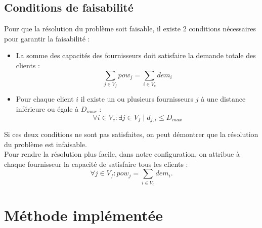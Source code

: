 \documentclass[letterpaper]{article}
\begin{document}
\subsection{Conditions de faisabilité}
Pour que la résolution du problème soit faisable, il existe 2 conditions nécessaires pour garantir la faisabilité :
\begin{itemize}
\item La somme des capacités des fournisseurs doit satisfaire la demande totale des clients : \begin{equation*}
\sum_{j \in V_{f}}{pow_{j}}  = \sum_{i \in V_{c}}{dem_{i}}
\end{equation*}
\item Pour chaque client $i$ il existe un ou plusieurs fournisseurs $j$ à une distance inférieure ou égale à $D_{max}$ :
\begin{equation*}
\forall i \in V_{c} :  \exists j \in V_{f} \mid d_{j,i} \leq D_{max}
\end{equation*}
\end{itemize}
Si ces deux conditions ne sont pas satisfaites, on peut démontrer que la résolution du problème est infaisable.\\
Pour rendre la résolution plus facile, dans notre configuration, on attribue à chaque fournisseur la capacité de satisfaire tous les clients : 
\begin{equation*}
\forall j \in V_{f} : pow_{j}=\sum_{i \in V_{c}}{dem_{i}}.
\end{equation*}
\section{Méthode implémentée}
\end{document}
